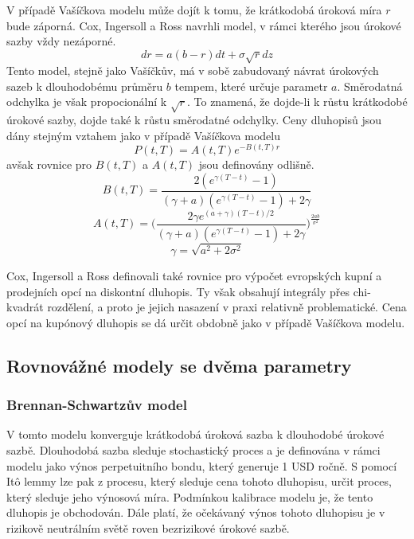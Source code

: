 \documentclass[a4paper]{book}
\begin{document}
V případě Vašíčkova modelu může dojít k tomu, že krátkodobá úroková míra $r$ bude záporná. Cox, Ingersoll a Ross navrhli model, v rámci kterého jsou úrokové sazby vždy nezáporné.
\begin{equation*}
dr = a(b-r)dt + \sigma \sqrt{r}dz
\end{equation*}
Tento model, stejně jako Vašíčkův, má v sobě zabudovaný návrat úrokových sazeb k dlouhodobému průměru $b$ tempem, které určuje parametr $a$. Směrodatná odchylka je však propocionální k $\sqrt{r}$. To znamená, že dojde-li k růstu krátkodobé úrokové sazby, dojde také k růstu směrodatné odchylky. Ceny dluhopisů jsou dány stejným vztahem jako v případě Vašíčkova modelu
\begin{equation*}
P(t,T) = A(t,T)e^{-B(t,T)r}
\end{equation*}
avšak rovnice pro $B(t,T)$ a $A(t,T)$ jsou definovány odlišně.
\begin{equation*}
B(t,T)=\frac{2(e^{\gamma(T-t)}-1)}{(\gamma + a)(e^{\gamma (T-t)} - 1) + 2 \gamma}
\end{equation*}
\begin{equation*}
A(t,T)=\Bigg( \frac{2 \gamma e^{(a + \gamma)(T - t)/2}}{(\gamma + a)(e^{\gamma (T - t)} - 1) + 2 \gamma} \Bigg)^{\frac{2ab}{\sigma^2}}
\end{equation*}
\begin{equation*}
\gamma = \sqrt{a^2 + 2 \sigma^2}
\end{equation*}

Cox, Ingersoll a Ross definovali také rovnice pro výpočet evropských kupní a prodejních opcí na diskontní dluhopis. Ty však obsahují integrály přes chi-kvadrát rozdělení, a proto je jejich nasazení v praxi relativně problematické. Cena opcí na kupónový dluhopis se dá určit obdobně jako v případě Vašíčkova modelu.

\subsection{Rovnovážné modely se dvěma parametry}

\subsubsection{Brennan-Schwartzův model}

V tomto modelu konverguje krátkodobá úroková sazba k dlouhodobé úrokové sazbě. Dlouhodobá sazba sleduje stochastický proces a je definována v rámci modelu jako výnos perpetuitního bondu, který generuje 1 USD ročně. S pomocí It\^o lemmy lze pak z procesu, který sleduje cena tohoto dluhopisu, určit proces, který sleduje jeho výnosová míra. Podmínkou kalibrace modelu je, že tento dluhopis je obchodován. Dále platí, že očekávaný výnos tohoto dluhopisu je v rizikově neutrálním světě roven bezrizikové úrokové sazbě.
\end{document}
